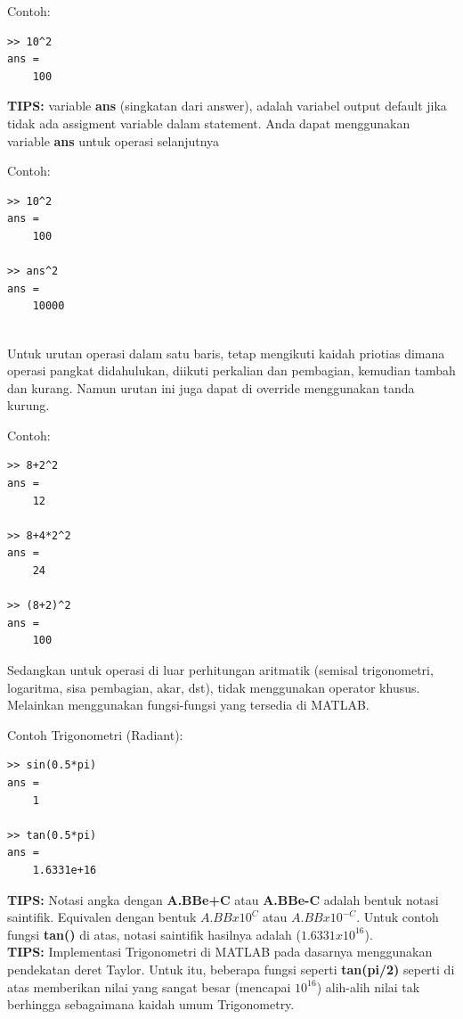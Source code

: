 \documentclass[12pt]{book}
\begin{document}
	Contoh:
	\begin{verbatim}
>> 10^2
ans = 
    100
	\end{verbatim}
	
	\textbf{TIPS:} variable \textbf{ans} (singkatan dari answer), adalah variabel output default jika tidak ada assigment variable dalam statement.
	Anda dapat menggunakan variable \textbf{ans} untuk operasi selanjutnya
	
	Contoh:
	\begin{verbatim}
>> 10^2
ans = 
    100
	
>> ans^2
ans = 
    10000
	\end{verbatim}
	\\
	
	Untuk urutan operasi dalam satu baris, tetap mengikuti kaidah priotias dimana operasi pangkat didahulukan, diikuti perkalian dan pembagian, kemudian tambah dan kurang.
	Namun urutan ini juga dapat di override menggunakan tanda kurung.
	
	Contoh:
	\begin{verbatim}
>> 8+2^2
ans = 
    12

>> 8+4*2^2
ans = 
    24
	
>> (8+2)^2
ans =
    100
	\end{verbatim}

	Sedangkan untuk operasi di luar perhitungan aritmatik (semisal trigonometri, logaritma, sisa pembagian, akar, dst), tidak menggunakan operator khusus.
	Melainkan menggunakan fungsi-fungsi yang tersedia di MATLAB.
	
	Contoh Trigonometri (Radiant):
	\begin{verbatim}
>> sin(0.5*pi)
ans = 
    1
    
>> tan(0.5*pi)
ans = 
    1.6331e+16
	\end{verbatim}

	\textbf{TIPS:} Notasi angka dengan \textbf{A.BBe+C} atau \textbf{A.BBe-C} adalah bentuk notasi saintifik.
	Equivalen dengan bentuk $A.BB x 10^C$ atau $A.BB x 10^{-C}$.
	Untuk contoh fungsi \textbf{tan()} di atas, notasi saintifik hasilnya adalah (\textbf{$1.6331x10^{16}$}).\\

	\textbf{TIPS:} Implementasi Trigonometri di MATLAB pada dasarnya menggunakan pendekatan deret Taylor.
	Untuk itu, beberapa fungsi seperti \textbf{tan(pi/2)} seperti di atas memberikan nilai yang sangat besar (mencapai $10^{16}$)
	alih-alih nilai tak berhingga sebagaimana kaidah umum Trigonometry.
	
\end{document}
